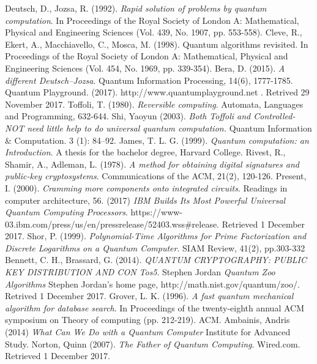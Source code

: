 \documentclass[12pt,a4paper,openright]{report}
\begin{document}
\begin{thebibliography}{40}
     Deutsch, D., Jozsa, R. (1992). \emph{Rapid solution of problems by quantum computation}. In Proceedings of the Royal Society of London A: Mathematical, Physical and Engineering Sciences (Vol. 439, No. 1907, pp. 553-558).
     Cleve, R., Ekert, A., Macchiavello, C., Mosca, M. (1998). Quantum algorithms revisited. In Proceedings of the Royal Society of London A: Mathematical, Physical and Engineering Sciences (Vol. 454, No. 1969, pp. 339-354). 
     Bera, D. (2015). \emph{A different Deutsch–Jozsa}. Quantum Information Processing, 14(6), 1777-1785.
     Quantum Playground. (2017). http://www.quantumplayground.net . Retrived 29 November 2017.
     Toffoli, T. (1980). \emph{Reversible computing}. Automata, Languages and Programming, 632-644.
     Shi, Yaoyun (2003). \emph{Both Toffoli and Controlled-NOT need little help to do universal quantum computation.} Quantum Information \& Computation. 3 (1): 84–92.
     James, T. L. G. (1999). \emph{Quantum computation: an Introduction}. A thesis for the bachelor degree, Harvard College. 
     Rivest, R., Shamir, A., Adleman, L. (1978). \emph{A method for obtaining digital signatures and public-key cryptosystems}. Communications of the ACM, 21(2), 120-126.
     Present, I. (2000). \emph{Cramming more components onto integrated circuits}. Readings in computer architecture, 56.
     (2017) \emph{IBM Builds Its Most Powerful Universal Quantum Computing Processors}. https://www-03.ibm.com/press/us/en/pressrelease/52403.wss\#release. Retrieved 1 December 2017.
     Shor, P. (1999). \emph{Polynomial-Time Algorithms for Prime Factorization and Discrete Logarithms on a Quantum Computer}. SIAM Review, 41(2), pp.303-332
     Bennett, C. H., Brassard, G. (2014). \emph{QUANTUM CRYPTOGRAPHY: PUBLIC KEY DISTRIBUTION AND CON Tos5}.
     Stephen Jordan \emph{Quantum Zoo Algorithms} Stephen Jordan's home page, http://math.nist.gov/quantum/zoo/. Retrived 1 December 2017.
     Grover, L. K. (1996). \emph{A fast quantum mechanical algorithm for database search}. In Proceedings of the twenty-eighth annual ACM symposium on Theory of computing (pp. 212-219). ACM.
     Ambainis, Andris (2014) \emph{What Can We Do with a Quantum Computer} Institute for Advanced Study.
     Norton, Quinn (2007). \emph{The Father of Quantum Computing}. Wired.com. Retrieved 1 December 2017.
\end{thebibliography}
\end{document}
